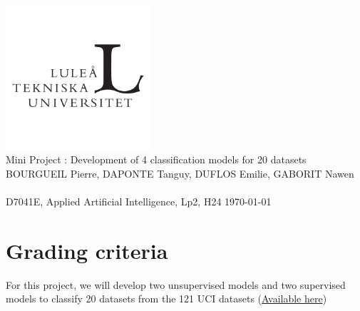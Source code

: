 \documentclass[10pt, a4paper]{article}
\author{}
\begin{document}
    \begin{titlepage}      
        \begin{center}
            \includegraphics[width=0.4\textwidth]{lulea-tekniska-universitet-logo.png}\\[4cm]
            \huge{Mini Project : Development of 4 classification models for 20 datasets}\\[1cm]
            \linespread{1.2}\large { BOURGUEIL Pierre, DAPONTE Tanguy, DUFLOS Emilie, GABORIT Nawen}\\[0.5cm]
            \linespread{1}~\\[2cm]
            {\Large D7041E, Applied Artificial Intelligence, Lp2, H24}    
            \vfill
            \today
        \end{center}
    \end{titlepage}

\newpage

\tableofcontents
\newpage

\section{Grading criteria}
For this project, we will develop two unsupervised models and two supervised models to classify 20 datasets from the 121 UCI datasets (\href{https://archive.ics.uci.edu/datasets}{Available here})
\end{document}
